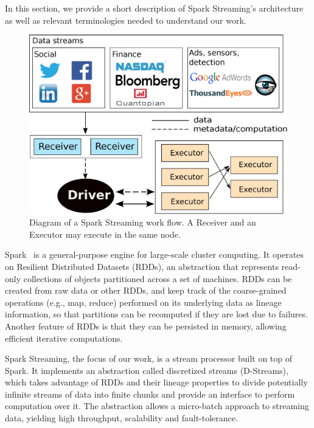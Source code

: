 In this section, we provide a short description of Spark Streaming's architecture as well as relevant terminologies needed to understand our work.

\begin{figure}[t!]
  \begin{center}
    \includegraphics[scale=0.35]{images_graphs/spark_architecture_v4.eps}
  \end{center}
  \caption{Diagram of a Spark Streaming work flow. A Receiver and an Executor may execute in the same node.}
  \label{fig:SparkStreaming_architecture}
\end{figure}

Spark~\cite{Spark} is a general-purpose engine for large-scale cluster computing. It operates on Resilient Distributed Datasets (RDDs), an abstraction that represents read-only collections of objects partitioned across a set of machines. RDDs can be created from raw data or other RDDs, and keep track of the coarse-grained operations (e.g., map, reduce) performed on its underlying data as lineage information, so that partitions can be recomputed if they are lost due to failures. 
Another feature of RDDs is that they can be persisted in memory, allowing efficient iterative computations.

Spark Streaming, the focus of our work, is a stream processor built on top of Spark.
It implements an abstraction called discretized streams (D-Streams), which takes advantage of RDDs and their lineage properties to divide potentially infinite streams of data into finite chunks and provide an interface to perform computation over it.
The abstraction allows a micro-batch approach to streaming data, yielding high throughput, scalability and fault-tolerance.


